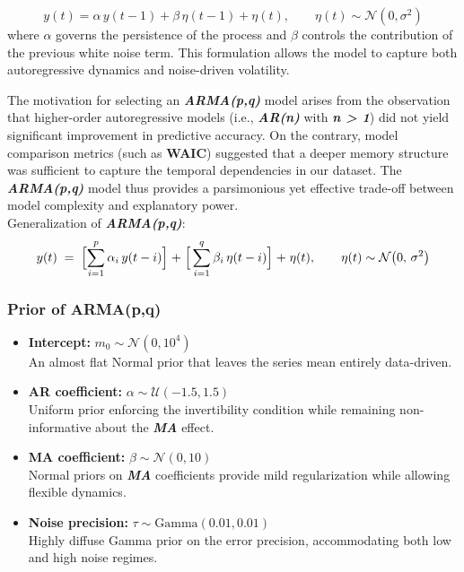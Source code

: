 \documentclass{Configuration_Files/PoliMi3i_thesis}
\begin{document}
\begin{equation}
y(t) = \alpha\, y(t-1) + \beta\, \eta(t-1) + \eta(t), \qquad \eta(t) \sim \mathcal{N}(0, \sigma^2)
\end{equation}
where $\alpha$ governs the persistence of the process and $\beta$ controls the contribution of the previous white noise term. This formulation allows the model to capture both autoregressive dynamics and noise-driven volatility.

The motivation for selecting an \textbf{\textit{ARMA(p,q)}} model arises from the observation that higher-order autoregressive models (i.e., \textbf{\textit{AR(n)}} with \textbf{\textit{n > 1}}) did not yield significant improvement in predictive accuracy. On the contrary, model comparison metrics (such as \textbf{WAIC}) suggested that a deeper memory structure was sufficient to capture the temporal dependencies in our dataset. The \textbf{\textit{ARMA(p,q)}} model thus provides a parsimonious yet effective trade-off between model complexity and explanatory power.\\
Generalization of \textbf{\textit{ARMA(p,q)}}:
\[
y(t) \;=\; \Bigl[\sum_{i=1}^{p} \alpha_{i}\,y(t - i)\Bigr]
\;+\;
\Bigr[\sum_{i=1}^{q} \beta_{i}\,\eta(t - i)\Bigl]
\;+\;
\eta(t),
\qquad
\eta(t) \sim \mathcal{N}\bigl(0,\,\sigma^{2}\bigr)
\]
\subsubsection{Prior of ARMA(p,q)}
\begin{itemize}
    \item \textbf{Intercept:} $m_0 \sim \mathcal{N}(0,10^4)$\\
    An almost flat Normal prior that leaves the series mean entirely data-driven.
    \item \textbf{AR coefficient:}  
    $\alpha \sim \mathcal{U}(-1.5,1.5)$\\
    Uniform prior enforcing the invertibility condition while remaining non-informative about the \textbf{\textit{MA}} effect.
    \item \textbf{MA coefficient:}  
     $\beta \sim \mathcal{N}\left(0, 10 \right)$\\
    Normal priors on \textbf{\textit{MA}} coefficients provide mild regularization while allowing flexible dynamics.
    \item \textbf{Noise precision:}  
    $\tau \sim \mathrm{Gamma}(0.01,0.01)$\\
    Highly diffuse Gamma prior on the error precision, accommodating both low and high noise regimes.
    
\end{itemize}
\end{document}
